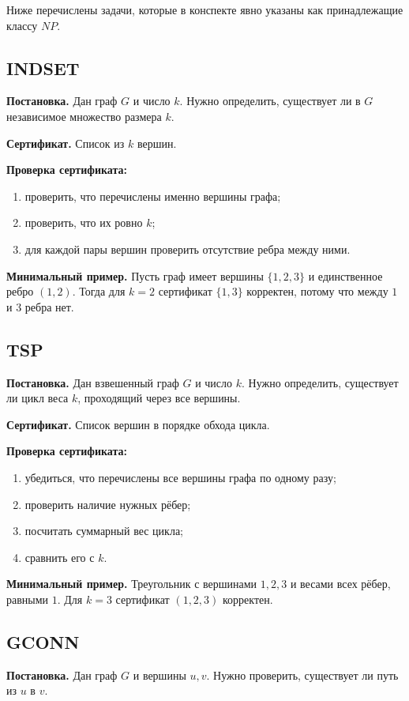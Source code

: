 \documentclass[12pt,a4paper]{article}
\theoremstyle{definition}
\theoremstyle{plain}
\begin{document}
Ниже перечислены задачи, которые в конспекте явно указаны как принадлежащие классу $NP$.

\subsection{\textsc{INDSET}}
\textbf{Постановка.} Дан граф $G$ и число $k$. Нужно определить, существует ли в $G$ независимое множество размера $k$.

\textbf{Сертификат.} Список из $k$ вершин.

\textbf{Проверка сертификата:}
\begin{enumerate}
\item проверить, что перечислены именно вершины графа;
\item проверить, что их ровно $k$;
\item для каждой пары вершин проверить отсутствие ребра между ними.
\end{enumerate}

\textbf{Минимальный пример.}
Пусть граф имеет вершины $\{1,2,3\}$ и единственное ребро $(1,2)$.
Тогда для $k=2$ сертификат $\{1,3\}$ корректен, потому что между $1$ и $3$ ребра нет.

\subsection{\textsc{TSP}}
\textbf{Постановка.} Дан взвешенный граф $G$ и число $k$. Нужно определить, существует ли цикл веса $k$, проходящий через все вершины.

\textbf{Сертификат.} Список вершин в порядке обхода цикла.

\textbf{Проверка сертификата:}
\begin{enumerate}
\item убедиться, что перечислены все вершины графа по одному разу;
\item проверить наличие нужных рёбер;
\item посчитать суммарный вес цикла;
\item сравнить его с $k$.
\end{enumerate}

\textbf{Минимальный пример.}
Треугольник с вершинами $1,2,3$ и весами всех рёбер, равными $1$. Для $k=3$ сертификат $(1,2,3)$ корректен.

\subsection{\textsc{GCONN}}
\textbf{Постановка.} Дан граф $G$ и вершины $u,v$. Нужно проверить, существует ли путь из $u$ в $v$.
\end{document}
